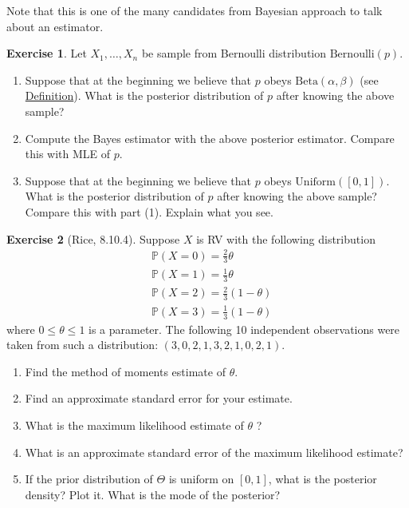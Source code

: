 \documentclass[
  openany]{book}
\providecommand{\tightlist}{%
  \setlength{\itemsep}{0pt}\setlength{\parskip}{0pt}}
\theoremstyle{definition}
\theoremstyle{definition}
\theoremstyle{definition}
\newtheorem{exercise}{Exercise}[chapter]
\theoremstyle{definition}
\theoremstyle{remark}
\begin{document}
Note that this is one of the many candidates from Bayesian approach to talk about an estimator.

\begin{exercise}

Let \(X_1, \dots, X_n\) be sample from Bernoulli distribution \(\mathrm{Bernoulli}(p)\).

\begin{enumerate}
\def\labelenumi{\arabic{enumi}.}
\item
  Suppose that at the beginning we believe that \(p\) obeys \(\mathrm{Beta}(\alpha, \beta)\) (see \href{https://en.wikipedia.org/wiki/Beta_distribution}{Definition}).
  What is the posterior distribution of \(p\) after knowing the above sample?
\item
  Compute the Bayes estimator with the above posterior estimator. Compare this with MLE of \(p\).
\item
  Suppose that at the beginning we believe that \(p\) obeys \(\mathrm{Uniform}([0,1])\).
  What is the posterior distribution of \(p\) after knowing the above sample? Compare this with part (1). Explain what you see.
\end{enumerate}

\end{exercise}

\begin{exercise}[Rice, 8.10.4]

Suppose \(X\) is RV with the following distribution
\[
\begin{aligned}
&\mathbb{P}(X= 0) = \frac{2}{3}\theta \\
& \mathbb{P}(X=1)=\frac{1}{3} \theta \\
& \mathbb{P}(X=2)=\frac{2}{3}(1-\theta) \\
& \mathbb{P}(X=3)=\frac{1}{3}(1-\theta)
\end{aligned}
\]
where \(0 \leq \theta \leq 1\) is a parameter. The following 10 independent observations were taken from such a distribution: \((3,0,2,1,3,2,1,0,2,1)\).

\begin{enumerate}
\def\labelenumi{\alph{enumi}.}
\tightlist
\item
  Find the method of moments estimate of \(\theta\).
\item
  Find an approximate standard error for your estimate.
\item
  What is the maximum likelihood estimate of \(\theta\) ?
\item
  What is an approximate standard error of the maximum likelihood estimate?
\item
  If the prior distribution of \(\Theta\) is uniform on \([0,1]\), what is the posterior density? Plot it. What is the mode of the posterior?
\end{enumerate}

\end{exercise}
\end{document}
